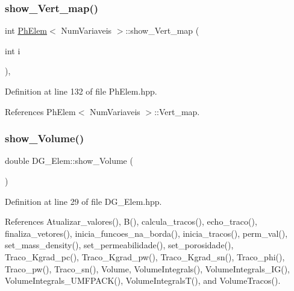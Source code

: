 \subsubsection{\texorpdfstring{show\+\_\+\+Vert\+\_\+map()}{show\_Vert\_map()}}
{\footnotesize\ttfamily int \hyperlink{classPhElem}{Ph\+Elem}$<$ Num\+Variaveis $>$\+::show\+\_\+\+Vert\+\_\+map (\begin{DoxyParamCaption}\item[{int}]{i }\end{DoxyParamCaption})\hspace{0.3cm}{\ttfamily [inline]}, {\ttfamily [inherited]}}



Definition at line 132 of file Ph\+Elem.\+hpp.



References Ph\+Elem$<$ Num\+Variaveis $>$\+::\+Vert\+\_\+map.

\mbox{\label{classDG__Elem_a01a49e07fd18a74e12eedf15cff7b8c7}} 
\subsubsection{\texorpdfstring{show\+\_\+\+Volume()}{show\_Volume()}}
{\footnotesize\ttfamily double D\+G\+\_\+\+Elem\+::show\+\_\+\+Volume (\begin{DoxyParamCaption}{ }\end{DoxyParamCaption})\hspace{0.3cm}{\ttfamily [inline]}}



Definition at line 29 of file D\+G\+\_\+\+Elem.\+hpp.



References Atualizar\+\_\+valores(), B(), calcula\+\_\+tracos(), echo\+\_\+traco(), finaliza\+\_\+vetores(), inicia\+\_\+funcoes\+\_\+na\+\_\+borda(), inicia\+\_\+tracos(), perm\+\_\+val(), set\+\_\+mass\+\_\+density(), set\+\_\+permeabilidade(), set\+\_\+porosidade(), Traco\+\_\+\+Kgrad\+\_\+pc(), Traco\+\_\+\+Kgrad\+\_\+pw(), Traco\+\_\+\+Kgrad\+\_\+sn(), Traco\+\_\+phi(), Traco\+\_\+pw(), Traco\+\_\+sn(), Volume, Volume\+Integrals(), Volume\+Integrals\+\_\+\+I\+G(), Volume\+Integrals\+\_\+\+U\+M\+F\+P\+A\+C\+K(), Volume\+Integrals\+T(), and Volume\+Tracos().

